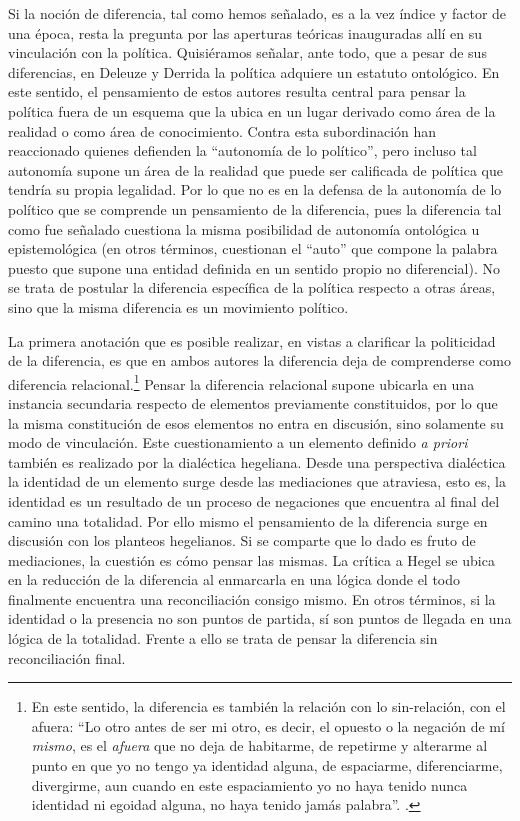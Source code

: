 Si la noción de diferencia, tal como hemos señalado, es a la vez índice y factor de una época, resta la pregunta por las aperturas teóricas inauguradas allí en su vinculación con la política. Quisiéramos señalar, ante todo, que a pesar de sus diferencias, en Deleuze y Derrida la política adquiere un estatuto ontológico. En este sentido, el pensamiento de estos autores resulta central para pensar la política fuera de un esquema que la ubica en un lugar derivado como área de la realidad o como área de conocimiento. Contra esta subordinación han reaccionado quienes defienden la \enquote{autonomía de lo político}, pero incluso tal autonomía supone un área de la realidad que puede ser calificada de política que tendría su propia legalidad. Por lo que no es en la defensa de la autonomía de lo político que se comprende un pensamiento de la diferencia, pues la diferencia tal como fue señalado cuestiona la misma posibilidad de autonomía ontológica u epistemológica (en otros términos, cuestionan el \enquote{auto} que compone la palabra puesto que supone una entidad definida en un sentido propio no diferencial). No se trata de postular la diferencia específica de la política respecto a otras áreas, sino que la misma diferencia es un movimiento político.

La primera anotación que es posible realizar, en vistas a clarificar la politicidad de la diferencia, es que en ambos autores la diferencia deja de comprenderse como diferencia relacional.\footnote{En este sentido, la diferencia es también la relación con lo sin-relación, con el afuera: \enquote{Lo otro antes de ser mi otro, es decir, el opuesto o la negación de mí \emph{mismo}, es el \emph{afuera} que no deja de habitarme, de repetirme y alterarme al punto en que yo no tengo ya identidad alguna, de espaciarme, diferenciarme, divergirme, aun cuando en este espaciamiento yo no haya tenido nunca identidad ni egoidad alguna, no haya tenido jamás palabra}. \cite[126]{@6993-MENGUE2008}.} Pensar la diferencia relacional supone ubicarla en una instancia secundaria respecto de elementos previamente constituidos, por lo que la misma constitución de esos elementos no entra en discusión, sino solamente su modo de vinculación. Este cuestionamiento a un elemento definido \emph{a priori} también es realizado por la dialéctica hegeliana. Desde una perspectiva dialéctica la identidad de un elemento surge desde las mediaciones que atraviesa, esto es, la identidad es un resultado de un proceso de negaciones que encuentra al final del camino una totalidad. Por ello mismo el pensamiento de la diferencia surge en discusión con los planteos hegelianos. Si se comparte que lo dado es fruto de mediaciones, la cuestión es cómo pensar las mismas. La crítica a Hegel se ubica en la reducción de la diferencia al enmarcarla en una lógica donde el todo finalmente encuentra una reconciliación consigo mismo. En otros términos, si la identidad o la presencia no son puntos de partida, sí son puntos de llegada en una lógica de la totalidad. Frente a ello se trata de pensar la diferencia sin reconciliación final.

